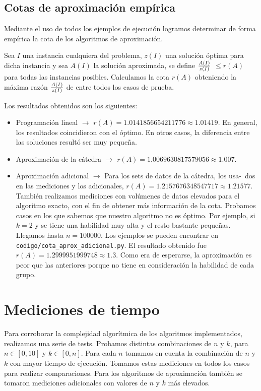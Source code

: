 \documentclass{article}
\begin{document}
\subsection{Cotas de aproximación empírica}

Mediante el uso de todos los ejemplos de ejecución logramos determinar de forma empírica la cota de los algoritmos de aproximación. 

Sea \(I\) una instancia cualquiera del problema, \(z(I)\) una solución óptima para dicha instancia y sea \(A(I)\) la solución aproximada, se define \(A(I) \over z(I)\) \(\leq r(A)\) para todas las instancias posibles. Calculamos la cota $r(A)$ obteniendo la máxima razón \(A(I) \over z(I)\) de entre todos los casos de prueba.

Los resultados obtenidos son los siguientes:
\begin{itemize}
    \item Programación lineal $\rightarrow$ $r(A) = 1.0141856654211776 \approx 1.01419$. En general, los resultados coincidieron con el óptimo. En otros casos, la diferencia entre las soluciones resultó ser muy pequeña.
    \item Aproximación de la cátedra $\rightarrow$ $r(A) = 1.0069630817579056 \approx 1.007$.
    \item Aproximación adicional $\rightarrow$ Para los sets de datos de la cátedra, los usa-\ dos en las mediciones y los adicionales, $r(A) = 1.2157676348547717 \approx 1.21577$. También realizamos mediciones con volúmenes de datos elevados para el algoritmo exacto, con el fin de obtener más información de la cota. Probamos casos en los que sabemos que nuestro algoritmo no es óptimo. Por ejemplo, si $k = 2$ y se tiene una habilidad muy alta y el resto bastante pequeñas. Llegamos hasta $n = 100000$. Los ejemplos se pueden encontrar en \texttt{codigo/cota\_aprox\_adicional.py}. El resultado obtenido fue $r(A) = 1.2999951999748 \approx 1.3$. Como era de esperarse, la aproximación es peor que las anteriores porque no tiene en consideración la habilidad de cada grupo.
\end{itemize}

\section{Mediciones de tiempo}
\label{sec:medTiempo}
Para corroborar la complejidad algorítmica de los algoritmos implementados, realizamos una serie de tests. Probamos distintas combinaciones de $n$ y $k$, para $n \in [0, 10]$ y $k \in [0, n]$. Para cada $n$ tomamos en cuenta la combinación de $n$ y $k$ con mayor tiempo de ejecución. Tomamos estas mediciones en todos los casos para realizar comparaciones. Para los algoritmos de aproximación también se tomaron mediciones adicionales con valores de $n$ y $k$ más elevados. 
\end{document}
